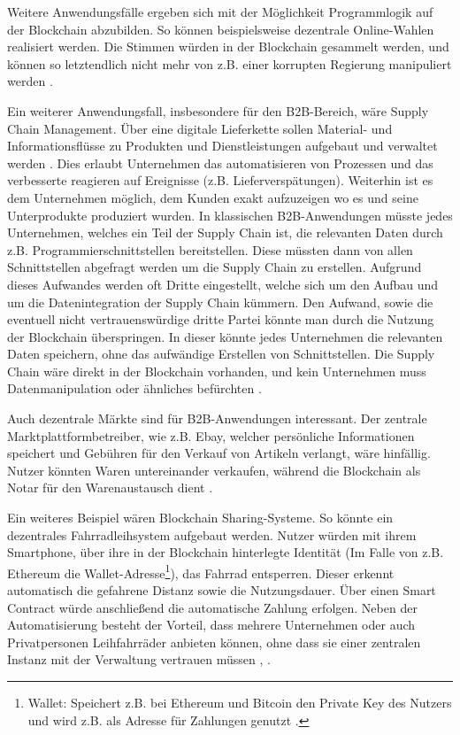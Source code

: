 Weitere Anwendungsfälle ergeben sich mit der Möglichkeit Programmlogik auf der Blockchain abzubilden. So können beispielsweise dezentrale Online-Wahlen realisiert werden. Die Stimmen würden in der Blockchain gesammelt werden, und können so letztendlich nicht mehr von z.B. einer korrupten Regierung manipuliert werden \cite{CastorEthereumVotingScheme2017}. 

Ein weiterer Anwendungsfall, insbesondere für den B2B-Bereich, wäre Supply Chain Management. Über eine digitale Lieferkette sollen Material- und Informationsflüsse zu Produkten und Dienstleistungen aufgebaut und verwaltet werden \cite{KriegerDefinitionSupplyChain}. Dies erlaubt Unternehmen das automatisieren von Prozessen und das verbesserte reagieren auf Ereignisse (z.B. Lieferverspätungen). Weiterhin ist es dem Unternehmen möglich, dem Kunden exakt aufzuzeigen wo es und seine Unterprodukte produziert wurden. In klassischen B2B-Anwendungen müsste jedes Unternehmen, welches ein Teil der Supply Chain ist, die relevanten Daten durch z.B. Programmierschnittstellen bereitstellen. Diese müssten dann von allen Schnittstellen abgefragt werden um die Supply Chain zu erstellen. Aufgrund dieses Aufwandes werden oft Dritte eingestellt, welche sich um den Aufbau und um die Datenintegration der Supply Chain kümmern. Den Aufwand, sowie die eventuell nicht vertrauenswürdige dritte Partei könnte man durch die Nutzung der Blockchain überspringen. In dieser könnte jedes Unternehmen die relevanten Daten speichern, ohne das aufwändige Erstellen von Schnittstellen. Die Supply Chain wäre direkt in der Blockchain vorhanden, und kein Unternehmen muss Datenmanipulation oder ähnliches befürchten \cite{KorpelaDigitalSupplyChain2017}.

Auch dezentrale Märkte sind für B2B-Anwendungen interessant. Der zentrale Marktplattformbetreiber, wie z.B. Ebay, welcher persönliche Informationen speichert und Gebühren für den Verkauf von Artikeln verlangt, wäre hinfällig. Nutzer könnten Waren untereinander verkaufen, während die Blockchain als Notar für den Warenaustausch dient \cite{BenHamidaBlockchainEnterpriseOverview2017}.

Ein weiteres Beispiel wären Blockchain Sharing-Systeme. So könnte ein dezentrales Fahrradleihsystem aufgebaut werden. Nutzer würden mit ihrem Smartphone, über ihre in der Blockchain hinterlegte Identität (Im Falle von z.B. Ethereum die Wallet-Adresse\footnote{Wallet: Speichert z.B. bei Ethereum und Bitcoin den Private Key des Nutzers und wird z.B. als Adresse für Zahlungen genutzt \cite{BlockchainWallet}.}), das Fahrrad entsperren. Dieser erkennt automatisch die gefahrene Distanz sowie die Nutzungsdauer. Über einen Smart Contract würde anschließend die automatische Zahlung erfolgen. Neben der Automatisierung besteht der Vorteil, dass mehrere Unternehmen oder auch Privatpersonen Leihfahrräder anbieten können, ohne dass sie einer zentralen Instanz mit der Verwaltung vertrauen müssen \cite{BlockchainBikes}, \cite{FischerIoTBlockchain}.  

